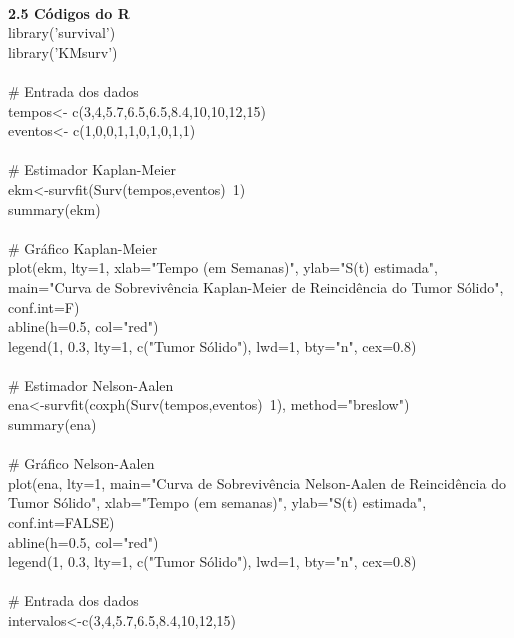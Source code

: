 \documentclass[12pt,a4paper]{article}
\begin{document}
	\vspace{1cm}\\
	\textbf{2.5 Códigos do R}
	\vspace{1cm}\\
	library('survival')\\
	library('KMsurv')\\
	\vspace{0.25cm}\\
	\# Entrada dos dados\\
	tempos<- c(3,4,5.7,6.5,6.5,8.4,10,10,12,15)\\
	eventos<- c(1,0,0,1,1,0,1,0,1,1)\\
	\vspace{0.25cm}\\
	\# Estimador Kaplan-Meier\\
	ekm<-survfit(Surv(tempos,eventos)~1)\\
	summary(ekm)\\
	\vspace{0.25cm}\\
	\# Gráfico Kaplan-Meier\\
	plot(ekm, lty=1, xlab="Tempo (em Semanas)", ylab="S(t) estimada", main="Curva de Sobrevivência Kaplan-Meier de Reincidência do Tumor Sólido", conf.int=F)\\
	abline(h=0.5, col="red")\\
	legend(1, 0.3, lty=1, c("Tumor Sólido"), lwd=1, bty="n", cex=0.8)\\
	\vspace{0.25cm}\\
	\# Estimador Nelson-Aalen\\
	ena<-survfit(coxph(Surv(tempos,eventos)~1), method="breslow")\\
	summary(ena)\\
	\vspace{0.25cm}\\
	\# Gráfico Nelson-Aalen\\
	plot(ena, lty=1, main="Curva de Sobrevivência Nelson-Aalen de Reincidência do Tumor Sólido", xlab="Tempo (em semanas)", ylab="S(t) estimada", conf.int=FALSE)\\
	abline(h=0.5, col="red")\\
	legend(1, 0.3, lty=1, c("Tumor Sólido"), lwd=1, bty="n", cex=0.8)\\
	\vspace{0.25cm}\\
	\# Entrada dos dados\\
	intervalos<-c(3,4,5.7,6.5,8.4,10,12,15)\\
\end{document}
